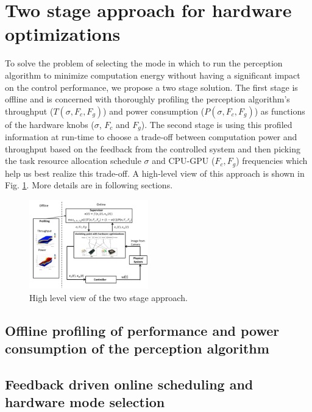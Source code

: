 \section{Two stage approach for hardware optimizations}
\label{sec:twoStage}
To solve the problem of selecting the mode in which to run the perception algorithm to minimize computation energy without having a significant impact on the control performance, we propose a two stage solution. The first stage is offline and is concerned with thoroughly profiling the perception algorithm's throughput ($T(\sigma,F_c,F_g)$) and power consumption ($P(\sigma,F_c,F_g)$) as functions of the hardware knobs ($\sigma$, $F_c$ and $F_g$). The second stage is using this profiled information at run-time to choose a trade-off between computation power and throughput based on the feedback from the controlled system and then picking the task resource allocation schedule $\sigma$ and CPU-GPU ($F_c,F_g$) frequencies which help us best realize this trade-off. A high-level view of this approach is shown in Fig. \ref{fig:juicyj}. More details are in following sections.

\begin{figure}[htbp]
	\centering
	\includegraphics[width=0.46\textwidth]{Figs/bigFig.pdf}
	\caption{High level view of the two stage approach.}
	\label{fig:juicyj}%
\end{figure}

\subsection{Offline profiling of performance and power consumption of the perception algorithm}
\label{sec:profiling}


\subsection{Feedback driven online scheduling and hardware mode selection}
\label{sec:scheduling}


